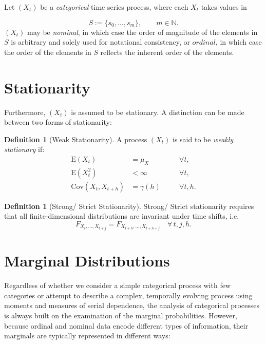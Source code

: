 ﻿\documentclass[12pt,a4paper]{scrreprt}
\theoremstyle{definition}
\newtheorem{definition}[theorem]{Definition}
\begin{document}
Let  $(X_t)$ be a \textit{categorical}  time series process, where each $X_t$ takes values in

\[
S := \{s_0, \dots, s_m\}, \qquad m \in \mathbb{N}.
\]
$(X_t)$ may be \textit{nominal}, in which case the order of magnitude of the elements in $S$ is arbitrary and solely used for notational consistency, or $ordinal$, in which case the order of the elements in $S$ reflects the inherent order of the elements.
\section{Stationarity}
Furthermore, $(X_t)$ is assumed to be stationary. A distinction can be made between two forms of stationarity:
\begin{definition}[Weak Stationarity]
    A process $(X_t)$ is said to be \emph{weakly stationary} if:
        \[
            \begin{aligned}
            \mathrm{E}(X_t) &= \mu_X \quad &&\forall t, \\
            \mathrm{E}(X_t^2) &< \infty \quad &&\forall t, \\
            \mathrm{Cov}(X_t, X_{t+h}) &= \gamma(h) \quad &&\forall t,h.
            \end{aligned}
        \]
\end{definition}

\begin{definition}[Strong/ Strict Stationarity]\label{def:Stationarity}
    Strong/ Strict stationarity requires that all finite-dimensional distributions are invariant under time shifts, i.e.
        \begin{equation*}
            F_{X_t,\ldots,X_{t+j}} = F_{X_{t+h},\ldots,X_{t+h+j}} \quad \forall\,t,j,h.
        \end{equation*}
\end{definition}
\section{Marginal Distributions}

Regardless of whether we consider a simple categorical process with few categories or attempt to describe a complex, temporally evolving process using moments and measures of serial dependence, the analysis of categorical processes is always built on the examination of the marginal probabilities. However, because ordinal and nominal data encode different types of information, their marginals are typically represented in different ways:
\end{document}
